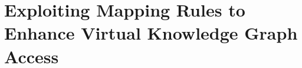 
\chapter{Exploiting Mapping Rules to Enhance Virtual Knowledge Graph Access}
\label{chapter:virtual}




